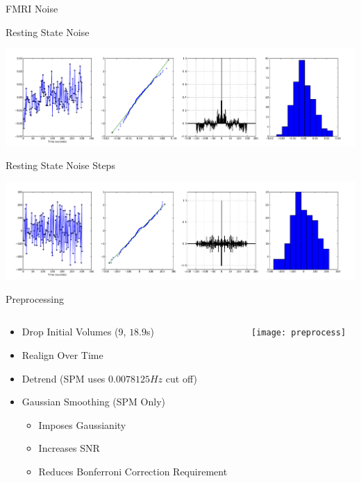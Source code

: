 \documentclass{beamer}
\begin{document}
\begin{frame}{FMRI Noise}
\centering

Resting State Noise

\includegraphics[trim=3cm 0cm 3cm 0cm,width=.75\textwidth]{noise2_0009_22_38_23}

Resting State Noise Steps

\includegraphics[trim=3cm 0cm 3cm 0cm,width=.75\textwidth]{noise2_0009d_22_38_23}

\end{frame}

\begin{frame}{Preprocessing}
  \begin{columns}
    \begin{column}{.6\textwidth}
        \begin{itemize}
            \item Drop Initial Volumes (9, $18.9$s)
            \item Realign Over Time
            \item Detrend (SPM uses $0.0078125 Hz$ cut off)
            \item Gaussian Smoothing (SPM Only)
            \begin{itemize}
                \item Imposes Gaussianity
                \item Increases SNR
                \item Reduces Bonferroni Correction Requirement
            \end{itemize}
        \end{itemize}
    \end{column}
    
    \begin{column}{.4\textwidth}
        \texttt{[image: preprocess]}
    \end{column}
  \end{columns}
\end{frame}
\end{document}
